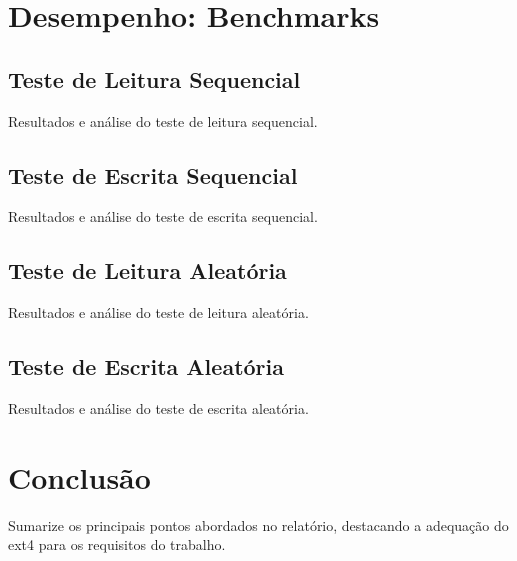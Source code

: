 \documentclass[
	12pt,				%
	openright,			%
	oneside,			%
	a4paper,			%
	chapter=TITLE,		%
	english,			%
	french,				%
	spanish,			%
	brazil				%
	]{abntex2}
\theoremstyle{definition}
\begin{document}
\chapter{Desempenho: Benchmarks}

\section{Teste de Leitura Sequencial}
Resultados e análise do teste de leitura sequencial.

\section{Teste de Escrita Sequencial}
Resultados e análise do teste de escrita sequencial.

\section{Teste de Leitura Aleatória}
Resultados e análise do teste de leitura aleatória.

\section{Teste de Escrita Aleatória}
Resultados e análise do teste de escrita aleatória.

\chapter{Conclusão}
Sumarize os principais pontos abordados no relatório, destacando a adequação do ext4 para os requisitos do trabalho.

\postextual



\cite{tanenbaum2010sistemas}
\end{document}
